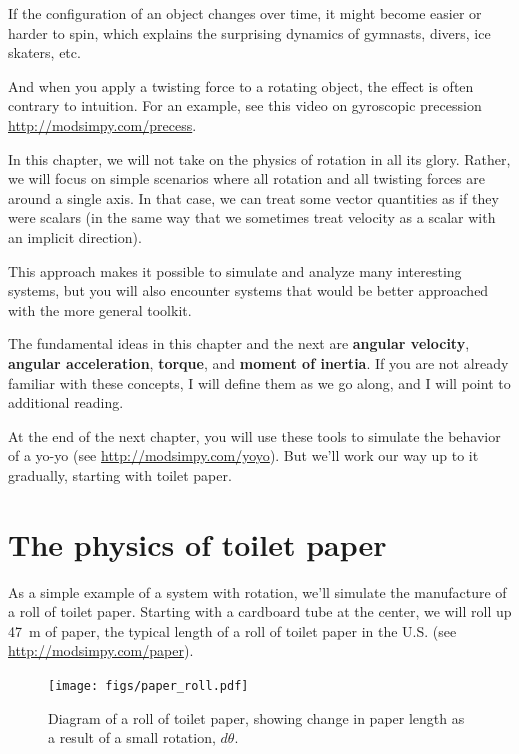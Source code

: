 \documentclass[12pt]{book}
\theoremstyle{exercise}
\begin{document}

If the configuration of an object changes over time, it might become easier or harder to spin, which explains the surprising dynamics of gymnasts, divers, ice skaters, etc.

And when you apply a twisting force to a rotating object, the effect is often contrary to intuition.  For an example, see this video on gyroscopic precession \url{http://modsimpy.com/precess}.


In this chapter, we will not take on the physics of rotation in all its glory.  Rather, we will focus on simple scenarios where all rotation and all twisting forces are around a single axis.  In that case, we can treat some vector quantities as if they were scalars (in the same way that we sometimes treat velocity as a scalar with an implicit direction).


This approach makes it possible to simulate and analyze many interesting systems, but you will also encounter systems that would be better approached with the more general toolkit.

The fundamental ideas in this chapter and the next are {\bf angular velocity}, {\bf angular acceleration}, {\bf torque}, and {\bf moment of inertia}.  If you are not already familiar with these concepts, I will define them as we go along, and I will point to additional reading.

At the end of the next chapter, you will use these tools to simulate the behavior of a yo-yo (see \url{http://modsimpy.com/yoyo}).  But we'll work our way up to it gradually, starting with toilet paper.



\section{The physics of toilet paper}
\label{paper}

As a simple example of a system with rotation, we'll simulate the manufacture of a roll of toilet paper.  Starting with a cardboard tube at the center, we will roll up \SI{47}{\meter} of paper, the typical length of a roll of toilet paper in the U.S. (see \url{http://modsimpy.com/paper}).


\begin{figure}
\centerline{\texttt{[image: figs/paper\_roll.pdf]}}
\caption{Diagram of a roll of toilet paper, showing change in paper length as a result of a small rotation, $d\theta$.}
\label{paper_roll}
\end{figure}
\end{document}
